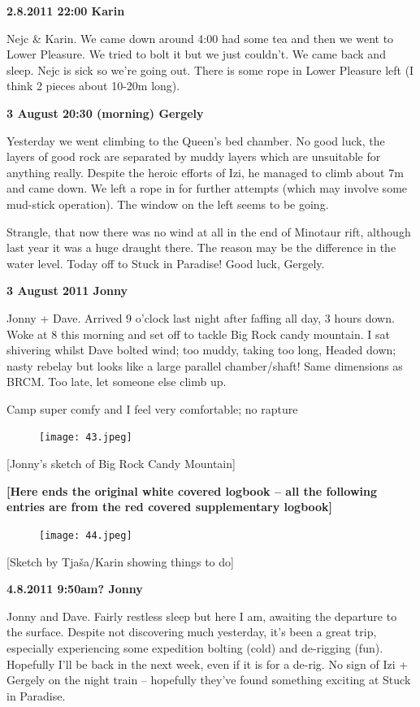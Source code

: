 \textbf{2.8.2011 22:00 Karin}

Nejc \& Karin. We came down around 4:00 had some tea and then we went to
Lower Pleasure. We tried to bolt it but we just couldn't. We came back
and sleep. Nejc is sick so we're going out. There is some rope in Lower
Pleasure left (I think 2 pieces about 10-20m long).

\textbf{3 August 20:30 (morning) Gergely}

Yesterday we went climbing to the Queen's bed chamber. No good luck, the
layers of good rock are separated by muddy layers which are unsuitable
for anything really. Despite the heroic efforts of Izi, he managed to
climb about 7m and came down. We left a rope in for further attempts
(which may involve some mud-stick operation). The window on the left
seems to be going.

Strangle, that now there was no wind at all in the end of Minotaur rift,
although last year it was a huge draught there. The reason may be the
difference in the water level. Today off to Stuck in Paradise! Good
luck, Gergely.

\textbf{3 August 2011 Jonny}

Jonny + Dave. Arrived 9 o'clock last night after faffing all day, 3
hours down. Woke at 8 this morning and set off to tackle Big Rock candy
mountain. I sat shivering whilst Dave bolted wind; too muddy, taking too
long, Headed down; nasty rebelay but looks like a large parallel
chamber/shaft! Same dimensions as BRCM. Too late, let someone else climb
up.

Camp super comfy and I feel very comfortable; no rapture

\begin{figure}[htbp]
\centering
\texttt{[image: 43.jpeg]}
\caption{}
\end{figure}

{[}Jonny's sketch of Big Rock Candy Mountain{]}

\textbf{{[}Here ends the original white covered logbook -- all the
following entries are from the red covered supplementary logbook{]}}

\begin{figure}[htbp]
\centering
\texttt{[image: 44.jpeg]}
\caption{}
\end{figure}

{[}Sketch by Tjaša/Karin showing things to do{]}

\textbf{4.8.2011 9:50am? Jonny}

Jonny and Dave. Fairly restless sleep but here I am, awaiting the
departure to the surface. Despite not discovering much yesterday, it's
been a great trip, especially experiencing some expedition bolting
(cold) and de-rigging (fun). Hopefully I'll be back in the next week,
even if it is for a de-rig. No sign of Izi + Gergely on the night train
-- hopefully they've found something exciting at Stuck in Paradise.

